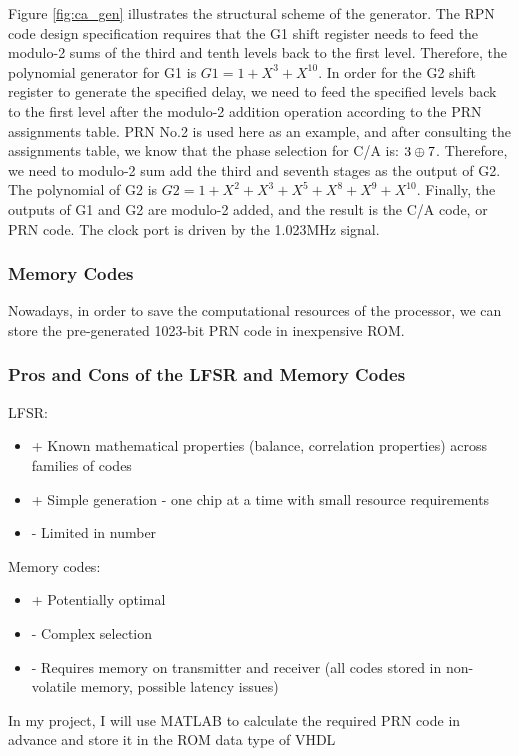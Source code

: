 Figure \ref{fig:ca_gen} illustrates the structural scheme of the generator. The RPN code design specification requires that the G1 shift register needs to feed the modulo-2 sums of the third and tenth levels back to the first level. Therefore, the polynomial generator for G1 is $G1=1+X^3+X^{10}$. In order for the G2 shift register to generate the specified delay, we need to feed the specified levels back to the first level after the modulo-2 addition operation according to the PRN assignments table. PRN No.2 is used here as an example, and after consulting the assignments table\cite{RN170}, we know that the phase selection for C/A is: $3\oplus 7$. Therefore, we need to modulo-2 sum add the third and seventh stages as the output of G2. The polynomial of G2 is $G2=1+X^2+X^3+X^5+X^8+X^9+X^{10}$. Finally, the outputs of G1 and G2 are modulo-2 added, and the result is the C/A code, or PRN  code. The clock port is driven by the 1.023MHz signal.

\subsubsection{Memory Codes}
Nowadays, in order to save the computational resources of the processor, we can store the pre-generated \num{1023}-bit PRN code in inexpensive ROM.

\subsubsection{Pros and Cons of the LFSR and Memory Codes}
LFSR:
\begin{itemize}
    \item + Known mathematical properties (balance, correlation properties) across families of codes
    \item + Simple generation - one chip at a time with small resource requirements
    \item - Limited in number
\end{itemize}
Memory codes:
\begin{itemize}
    \item + Potentially optimal
    \item - Complex selection
    \item - Requires memory on transmitter and receiver (all codes stored in non-volatile memory, possible latency issues)
\end{itemize}
In my project, I will use MATLAB to calculate the required PRN code in advance and store it in the ROM data type of VHDL

